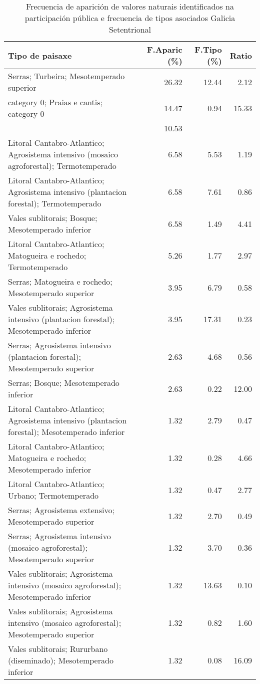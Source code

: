\begin{table}[p]
\centering
\caption{Frecuencia de aparición de valores naturais identificados na participación pública e frecuencia de tipos asociados Galicia Setentrional} 
\label{vsixotnat10}
\begin{tabular}{lrrr}
  \hline
Tipo de paisaxe & F.Aparic (\%) & F.Tipo (\%) & Ratio \\ 
  \hline
Serras; Turbeira; Mesotemperado superior & 26.32 & 12.44 & 2.12 \\ 
  category 0; Praias e cantis; category 0 & 14.47 & 0.94 & 15.33 \\ 
   & 10.53 &  &  \\ 
  Litoral Cantabro-Atlantico; Agrosistema intensivo (mosaico agroforestal); Termotemperado & 6.58 & 5.53 & 1.19 \\ 
  Litoral Cantabro-Atlantico; Agrosistema intensivo (plantacion forestal); Termotemperado & 6.58 & 7.61 & 0.86 \\ 
  Vales sublitorais; Bosque; Mesotemperado inferior & 6.58 & 1.49 & 4.41 \\ 
  Litoral Cantabro-Atlantico; Matogueira e rochedo; Termotemperado & 5.26 & 1.77 & 2.97 \\ 
  Serras; Matogueira e rochedo; Mesotemperado superior & 3.95 & 6.79 & 0.58 \\ 
  Vales sublitorais; Agrosistema intensivo (plantacion forestal); Mesotemperado inferior & 3.95 & 17.31 & 0.23 \\ 
  Serras; Agrosistema intensivo (plantacion forestal); Mesotemperado superior & 2.63 & 4.68 & 0.56 \\ 
  Serras; Bosque; Mesotemperado inferior & 2.63 & 0.22 & 12.00 \\ 
  Litoral Cantabro-Atlantico; Agrosistema intensivo (plantacion forestal); Mesotemperado inferior & 1.32 & 2.79 & 0.47 \\ 
  Litoral Cantabro-Atlantico; Matogueira e rochedo; Mesotemperado inferior & 1.32 & 0.28 & 4.66 \\ 
  Litoral Cantabro-Atlantico; Urbano; Termotemperado & 1.32 & 0.47 & 2.77 \\ 
  Serras; Agrosistema extensivo; Mesotemperado superior & 1.32 & 2.70 & 0.49 \\ 
  Serras; Agrosistema intensivo (mosaico agroforestal); Mesotemperado superior & 1.32 & 3.70 & 0.36 \\ 
  Vales sublitorais; Agrosistema intensivo (mosaico agroforestal); Mesotemperado inferior & 1.32 & 13.63 & 0.10 \\ 
  Vales sublitorais; Agrosistema intensivo (mosaico agroforestal); Mesotemperado superior & 1.32 & 0.82 & 1.60 \\ 
  Vales sublitorais; Rururbano (diseminado); Mesotemperado inferior & 1.32 & 0.08 & 16.09 \\ 
   \hline
\end{tabular}
\end{table}
